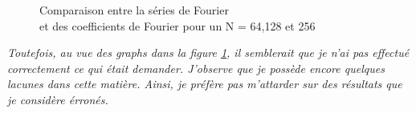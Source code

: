 \documentclass{article}
\begin{document}
\begin{figure}[H]
    \caption{Comparaison entre la séries de Fourier \\ et des coefficients de Fourier pour un N = 64,128 et 256}
    \label{fig0}
\end{figure}
\textit{Toutefois, au vue des graphs dans la figure \ref{fig0}, il semblerait que je n'ai pas effectué correctement ce qui était demander. J'observe que je possède encore quelques lacunes dans cette matière. Ainsi, je préfère pas m'attarder sur des résultats que je considère érronés.}

\newpage
\end{document}

